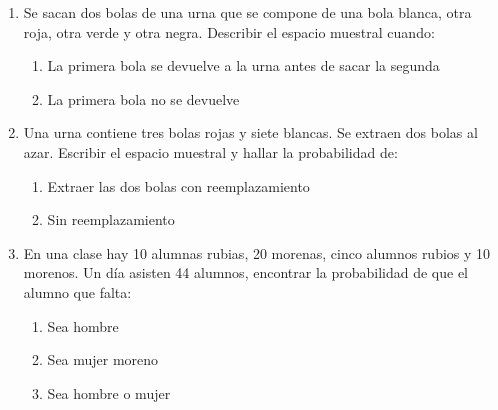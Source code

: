 \documentclass[12pt,letterpaper]{report}
\begin{document}
\begin{enumerate}
\begin{enumerate}
    \end{enumerate}
    \item Se sacan dos bolas de una urna que se compone de una bola blanca, otra roja, otra verde y otra negra. Describir el espacio muestral cuando:
    \begin{enumerate}
    \item La primera bola se devuelve a la urna antes de sacar la segunda
    \item La primera bola no se devuelve
    \end{enumerate}
    \item Una urna contiene tres bolas rojas y siete blancas. Se extraen dos bolas al azar. Escribir el espacio muestral y hallar la probabilidad de:
    \begin{enumerate}
    \item Extraer las dos bolas con reemplazamiento
    \item Sin reemplazamiento
    \end{enumerate}
    \item En una clase hay 10 alumnas rubias, 20 morenas, cinco alumnos rubios y 10 morenos. Un día asisten 44 alumnos, encontrar la probabilidad de que el alumno que falta:
    \begin{enumerate}
    \item Sea hombre
    \item Sea mujer moreno
    \item Sea hombre o mujer
    \end{enumerate}
\end{enumerate}
\end{document}
